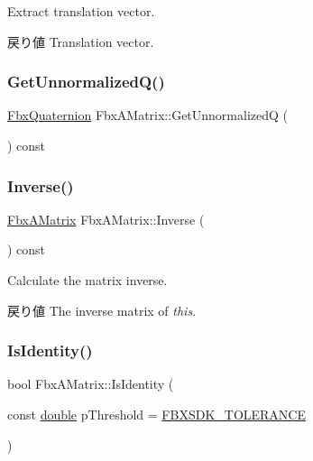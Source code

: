 Extract translation vector. \begin{DoxyReturn}{戻り値}
Translation vector. 
\end{DoxyReturn}
\mbox{\label{class_fbx_a_matrix_aa6c9cff20dd3d26d5df852705a0ee149}} 
\subsubsection{\texorpdfstring{Get\+Unnormalized\+Q()}{GetUnnormalizedQ()}}
{\footnotesize\ttfamily \hyperlink{class_fbx_quaternion}{Fbx\+Quaternion} Fbx\+A\+Matrix\+::\+Get\+UnnormalizedQ (\begin{DoxyParamCaption}{ }\end{DoxyParamCaption}) const}

\mbox{\label{class_fbx_a_matrix_a4093cf977851b49760e1c24c99d5bae7}} 
\subsubsection{\texorpdfstring{Inverse()}{Inverse()}}
{\footnotesize\ttfamily \hyperlink{class_fbx_a_matrix}{Fbx\+A\+Matrix} Fbx\+A\+Matrix\+::\+Inverse (\begin{DoxyParamCaption}{ }\end{DoxyParamCaption}) const}

Calculate the matrix inverse. \begin{DoxyReturn}{戻り値}
The inverse matrix of {\itshape this}. 
\end{DoxyReturn}
\mbox{\label{class_fbx_a_matrix_a785479d012314ec71198811c172ada98}} 
\subsubsection{\texorpdfstring{Is\+Identity()}{IsIdentity()}}
{\footnotesize\ttfamily bool Fbx\+A\+Matrix\+::\+Is\+Identity (\begin{DoxyParamCaption}\item[{const \hyperlink{class_fbx_a_matrix_ad463edbb9fea344643297701f159faa7}{double}}]{p\+Threshold = {\ttfamily \hyperlink{fbxtypes_8h_acf3cd6f208edb42ad9c9abbc1f7feea0}{F\+B\+X\+S\+D\+K\+\_\+\+T\+O\+L\+E\+R\+A\+N\+CE}} }\end{DoxyParamCaption})}

